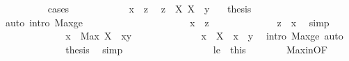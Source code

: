 \begin{isabellebody}
\ \ \ \ \ \ \ \ \isamarkupfalse%
\ cases\isanewline
\ \ \ \ \ \ \ \ \ \ \isamarkupfalse%
\ {\isachardoublequoteopen}x\ {\isasymle}\ z{\isachardoublequoteclose}\ \isamarkupfalse%
\ {\isacartoucheopen}z\ {\isasymin}\ X{\isacartoucheclose}\ {\isacartoucheopen}X\ {\isasymsubseteq}\ {\isacharbraceleft}{\kern0pt}{\isachardot}{\kern0pt}{\isachardot}{\kern0pt}y{\isacharbraceright}{\kern0pt}{\isacartoucheclose}\ {\isacharasterisk}{\kern0pt}{\isacharparenleft}{\kern0pt}{}{\isacharparenright}{\kern0pt}\ \isamarkupfalse%
\ {\isacharquery}{\kern0pt}thesis\isanewline
\ \ \ \ \ \ \ \ \ \ \ \ \isamarkupfalse%
\ {\isacharparenleft}{\kern0pt}auto\ intro{\isacharbang}{\kern0pt}{\isacharcolon}{\kern0pt}\ Max{\isacharunderscore}{\kern0pt}ge{\isacharparenright}{\kern0pt}\isanewline
\ \ \ \ \ \ \ \ \isamarkupfalse%
\isanewline
\ \ \ \ \ \ \ \ \ \ \isamarkupfalse%
\ {\isachardoublequoteopen}{\isasymnot}\ x\ {\isasymle}\ z{\isachardoublequoteclose}\isanewline
\ \ \ \ \ \ \ \ \ \ \isamarkupfalse%
\ \isamarkupfalse%
\ {\isachardoublequoteopen}z\ {\isacharless}{\kern0pt}\ x{\isachardoublequoteclose}\ \isamarkupfalse%
\ simp\isanewline
\ \ \ \ \ \ \ \ \ \ \isamarkupfalse%
\ \isamarkupfalse%
\ {\isachardoublequoteopen}x\ {\isasymle}\ Max\ {\isacharparenleft}{\kern0pt}X\ {\isasyminter}\ {\isacharbraceleft}{\kern0pt}x{\isachardot}{\kern0pt}{\isachardot}{\kern0pt}y{\isacharbraceright}{\kern0pt}{\isacharparenright}{\kern0pt}{\isachardoublequoteclose}\isanewline
\ \ \ \ \ \ \ \ \ \ \ \ \isamarkupfalse%
\ {\isacartoucheopen}x\ {\isasymin}\ X{\isacartoucheclose}\ {\isacharasterisk}{\kern0pt}{\isacharparenleft}{\kern0pt}{}{\isacharparenright}{\kern0pt}\ {\isacartoucheopen}x\ {\isasymle}\ y{\isacartoucheclose}\ \isamarkupfalse%
\ {\isacharparenleft}{\kern0pt}intro\ Max{\isacharunderscore}{\kern0pt}ge{\isacharparenright}{\kern0pt}\ auto\isanewline
\ \ \ \ \ \ \ \ \ \ \isamarkupfalse%
\ \isamarkupfalse%
\ {\isacharquery}{\kern0pt}thesis\ \isamarkupfalse%
\ simp\isanewline
\ \ \ \ \ \ \ \ \isamarkupfalse%
\ \isacommand{{\isacharbraceright}{\kern0pt}}\isamarkupfalse%
\isanewline
\ \ \ \ \ \ \isamarkupfalse%
\ le\ {\isacharequal}{\kern0pt}\ this\isanewline
\ \ \ \ \ \ \isamarkupfalse%
\ Max{\isacharunderscore}{\kern0pt}in{\isacharbrackleft}{\kern0pt}OF\ {\isacharasterisk}{\kern0pt}{\isacharbrackright}{\kern0pt}\ \isamarkupfalse%

\end{isabellebody}
